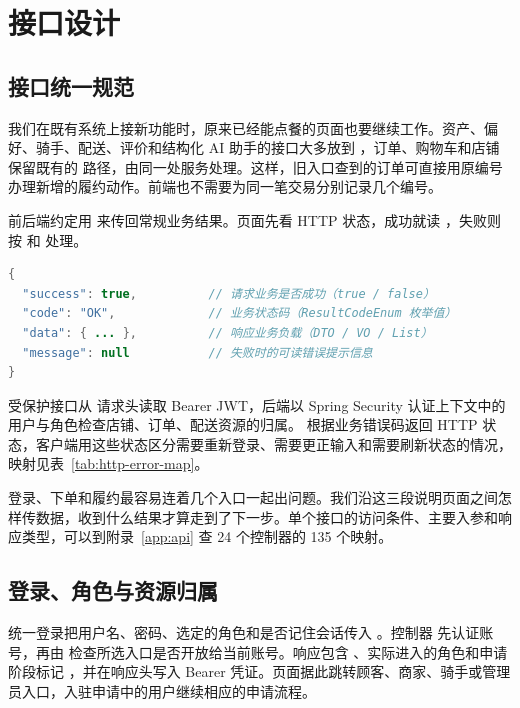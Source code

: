 \section{接口设计}

\subsection{接口统一规范}

我们在既有系统上接新功能时，原来已经能点餐的页面也要继续工作。资产、偏好、骑手、配送、评价和结构化 AI 助手的接口大多放到 ，订单、购物车和店铺保留既有的  路径，由同一处服务处理。这样，旧入口查到的订单可直接用原编号办理新增的履约动作。前端也不需要为同一笔交易分别记录几个编号。

前后端约定用  来传回常规业务结果。页面先看 HTTP 状态，成功就读 ，失败则按  和  处理。
\begin{lstlisting}[language=Java,caption={后端统一响应包装结构 HttpResult<T> 示例}]
{
  "success": true,          // 请求业务是否成功（true / false）
  "code": "OK",             // 业务状态码（ResultCodeEnum 枚举值）
  "data": { ... },          // 响应业务负载（DTO / VO / List）
  "message": null           // 失败时的可读错误提示信息
}
\end{lstlisting}

受保护接口从  请求头读取 Bearer JWT，后端以 Spring Security 认证上下文中的用户与角色检查店铺、订单、配送资源的归属。 根据业务错误码返回 HTTP 状态，客户端用这些状态区分需要重新登录、需要更正输入和需要刷新状态的情况，映射见表~\ref{tab:http-error-map}。

登录、下单和履约最容易连着几个入口一起出问题。我们沿这三段说明页面之间怎样传数据，收到什么结果才算走到了下一步。单个接口的访问条件、主要入参和响应类型，可以到附录~\ref{app:api} 查 24 个控制器的 135 个映射。

\subsection{登录、角色与资源归属}\label{sec:def-api-auth}

统一登录把用户名、密码、选定的角色和是否记住会话传入 \mbox{}。控制器 \mbox{} 先认证账号，再由 \mbox{} 检查所选入口是否开放给当前账号。响应包含 \mbox{}、实际进入的角色和申请阶段标记 \mbox{}，并在响应头写入 Bearer 凭证。页面据此跳转顾客、商家、骑手或管理员入口，入驻申请中的用户继续相应的申请流程。


